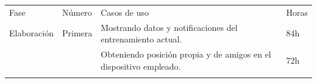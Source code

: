 \begin{longtable}[c]{@{}llll@{}}
\hline\noalign{\medskip}
\begin{minipage}[b]{0.17\columnwidth}\raggedright
Fase
\end{minipage} & \begin{minipage}[b]{0.12\columnwidth}\raggedright
Número
\end{minipage} & \begin{minipage}[b]{0.58\columnwidth}\raggedright
Casos de uso
\end{minipage} & \begin{minipage}[b]{0.12\columnwidth}\raggedright
Horas
\end{minipage}
\\\noalign{\medskip}
\hline\noalign{\medskip}
\begin{minipage}[t]{0.17\columnwidth}\raggedright
Elaboración
\end{minipage} & \begin{minipage}[t]{0.12\columnwidth}\raggedright
Primera
\end{minipage} & \begin{minipage}[t]{0.58\columnwidth}\raggedright
Mostrando datos y notificaciones del entrenamiento actual.
\end{minipage} & \begin{minipage}[t]{0.12\columnwidth}\raggedright
84h
\end{minipage}
\\\noalign{\medskip}
\begin{minipage}[t]{0.17\columnwidth}\raggedright
\end{minipage} & \begin{minipage}[t]{0.12\columnwidth}\raggedright
\end{minipage} & \begin{minipage}[t]{0.58\columnwidth}\raggedright
Obteniendo posición propia y de amigos en el dispositivo empleado.
\end{minipage} & \begin{minipage}[t]{0.12\columnwidth}\raggedright
72h
\end{minipage}
\\\noalign{\medskip}
\begin{minipage}[t]{0.17\columnwidth}\raggedright
\end{minipage} & \begin{minipage}[t]{0.12\columnwidth}\raggedright
\end{minipage} & \begin{minipage}[t]{0.58\columnwidth}\raggedright

\end{minipage}
\end{longtable}
